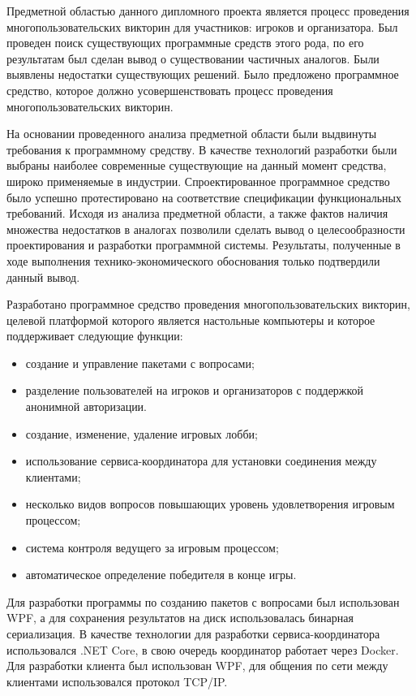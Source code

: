
Предметной областью данного дипломного проекта является процесс проведения многопользовательских викторин для участников: игроков и организатора. 
Был проведен поиск существующих программные средств этого рода, по его результатам был сделан вывод о существовании частичных аналогов. 
Были выявлены недостатки существующих решений. Было предложено программное средство, которое должно усовершенствовать процесс проведения многопользовательских викторин.

На основании проведенного анализа предметной области были выдвинуты требования к программному средству. 
В качестве технологий разработки были выбраны наиболее современные существующие на данный момент средства, широко применяемые в индустрии. 
Спроектированное программное средство было успешно протестировано на соответствие спецификации функциональных требований. 
Исходя из анализа предметной области, а также фактов наличия множества недостатков в аналогах позволили сделать вывод о 
целесообразности проектирования и разработки программной системы. Результаты, полученные в ходе выполнения технико-экономического обоснования только подтвердили данный вывод.

Разработано программное средство проведения многопользовательских викторин, целевой платформой которого является настольные компьютеры и которое поддерживает следующие функции:
\begin{itemize}
	\item создание и управление пакетами с вопросами;
	\item разделение пользователей на игроков и организаторов с поддержкой анонимной авторизации.
	\item создание, изменение, удаление игровых лобби;
	\item использование сервиса-координатора для установки соединения между клиентами;
	\item несколько видов вопросов повышающих уровень удовлетворения игровым процессом;
	\item система контроля ведущего за игровым процессом;
	\item автоматическое определение победителя в конце игры.
\end{itemize}

Для разработки программы по созданию пакетов с вопросами был использован WPF, а для сохранения результатов на диск использовалась бинарная сериализация. В качестве технологии
для разработки сервиса-координатора использовался .NET Core, в свою очередь координатор работает через Docker. Для разработки клиента был использован
WPF, для общения по сети между клиентами использовался протокол TCP/IP.
